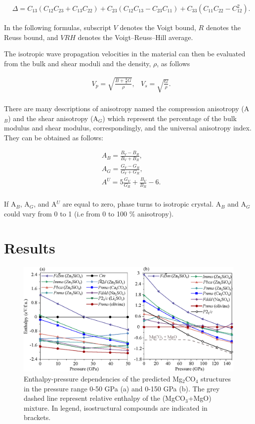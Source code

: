 \documentclass[a4paperm]{article}
\begin{document}
 \begin{align*}
 	&\Delta=C_{13}(C_{12}C_{23}+C_{13}C_{22})+C_{23}(C_{12}C_{13}-C_{23}C_{11})+C_{33}(C_{11}C_{22}-C^2_{12}).
 \end{align*}
 
In the following formulas, subscript $V$ denotes the Voigt bound, $R$ denotes the Reuss bound, and $VRH$ denotes the Voigt–Reuss–Hill average.

The isotropic wave propagation velocities in the material can then be evaluated from the bulk and shear moduli and the density, $\rho$, as follows

\begin{align*}
  & V_p=\sqrt{\frac{B+\frac{4}{3}G}{\rho}},
  &V_s = \sqrt{\frac{G}{\rho}}. \\	
\end{align*}

There are many descriptions of anisotropy named the compression anisotropy (A$_B$) and the shear anisotropy (A$_G$) which represent the percentage of the bulk modulus and shear modulus, correspondingly, and the universal anisotropy index. They can be obtained as follows:

\begin{align*}
	&A_B=\frac{B_V-B_R}{B_V+B_R}, \\
	&A_G=\frac{G_V-G_R}{G_V+G_R}, \\
	&A^U=5\frac{G_V}{G_R}+\frac{B_V}{B_R}-6  .  \\
\end{align*}

If A$_B$, A$_G$, and A$^U$ are equal to zero, phase turns to isotropic crystal. A$_B$ and A$_G$ could vary from 0 to 1 (i.e from 0 to 100 \% anisotropy).


\section*{Results}


\begin{figure}[H]
	\includegraphics[width=\textwidth]{vs_Mg2CO4_for_suppl} \centering
	\caption{Enthalpy-pressure dependencies of the predicted Mg$_2$CO$_4$ structures in the pressure range 0-50 GPa (a) and 0-150 GPa (b). The grey dashed line represent relative enthalpy of the (MgCO$_3$+MgO) mixture. In legend, isostructural compounds are indicated in brackets.} 
\label{E-P_supp}
\end{figure}
\end{document}
